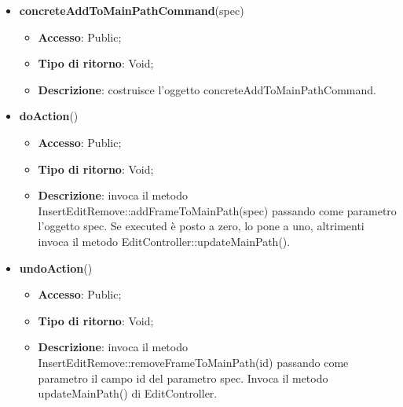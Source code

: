 {{{			
			\begin{itemize}
				\item \textbf{concreteAddToMainPathCommand}(spec)
				\begin{itemize}
					\item \textbf{Accesso}: Public;
					\item \textbf{Tipo di ritorno}: Void;
					\item \textbf{Descrizione}: costruisce l’oggetto concreteAddToMainPathCommand.
				\end{itemize}
				\item \textbf{doAction}()
				\begin{itemize}
					\item \textbf{Accesso}: Public;
					\item \textbf{Tipo di ritorno}: Void;
					\item \textbf{Descrizione}: invoca il metodo InsertEditRemove::addFrameToMainPath(spec) passando come parametro l'oggetto spec. Se executed è posto a zero, lo pone a uno, altrimenti invoca il metodo EditController::updateMainPath().
				\end{itemize}
				\item \textbf{undoAction}()
				\begin{itemize}
					\item \textbf{Accesso}: Public;
					\item \textbf{Tipo di ritorno}: Void;
					\item \textbf{Descrizione}: invoca il metodo InsertEditRemove::removeFrameToMainPath(id) passando come parametro il campo id del parametro spec. Invoca il metodo updateMainPath() di EditController.
				\end{itemize}
			\end{itemize}
			}
			
}}
